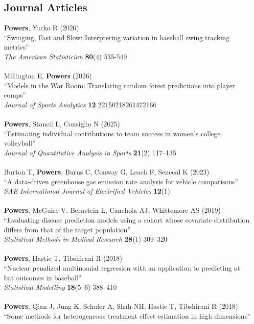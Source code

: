 \documentclass{article}
\begin{document}
\subsection*{\sc Journal Articles}

{\bf Powers}, Yurko R (2026)\\
``Swinging, Fast and Slow: Interpreting variation in baseball swing tracking metrics''\\
{\it The American Statistician} \textbf{80}(4) 535-549\\
~\\
Millington E, {\bf Powers} (2026)\\
``Models in the War Room: Translating random forest predictions into player comps''\\
{\it Journal of Sports Analytics} \textbf{12} 22150218261472166\\
~\\
{\bf Powers}, Stancil L, Consiglio N (2025)\\
``Estimating individual contributions to team success in women's college volleyball''\\
{\it Journal of Quantitative Analysis in Sports} {\bf 21}(2) 117--135\\
~\\
Burton T, {\bf Powers}, Burns C, Conway G, Leach F, Senecal K (2023)\\
``A data-driven greenhouse gas emission rate analysis for vehicle comparisons''\\
{\it SAE International Journal of Electrified Vehicles} {\bf 12}(1)\\
~\\
{\bf Powers}, McGuire V, Bernstein L, Canchola AJ, Whittemore AS (2019) ``Evaluating disease prediction models using a cohort whose covariate distribution differs from that of the target population''\\
{\it Statistical Methods in Medical Research} {\bf 28}(1) 309--320\\
~\\
{\bf Powers}, Hastie T, Tibshirani R (2018)\\
``Nuclear penalized multinomial regression with an application to predicting at bat outcomes in baseball''\\
{\it Statistical Modelling} {\bf 18}(5--6) 388--410\\
~\\
{\bf Powers}, Qian J, Jung K, Schuler A, Shah NH, Hastie T, Tibshirani R (2018)\\
``Some methods for heterogeneous treatment effect estimation in high dimensions''\\
\end{document}
